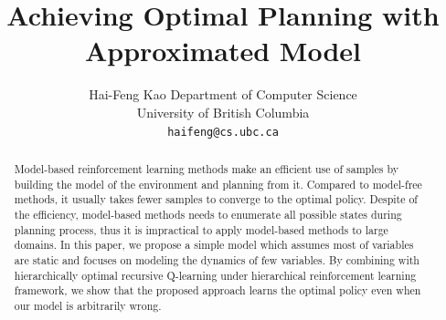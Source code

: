 \documentclass{article} %
\title{Achieving Optimal Planning with Approximated Model}
\author{
Hai-Feng Kao
Department of Computer Science\\
University of British Columbia\\
\texttt{haifeng@cs.ubc.ca}
}
\begin{document}
\maketitle

\begin{abstract}
Model-based reinforcement learning methods make an efficient use of samples by 
building the model of the environment and planning from it.
Compared to model-free methods, it usually takes fewer samples to converge to the optimal policy.
Despite of the efficiency, model-based methods
needs to enumerate all possible states during planning process,
thus it is impractical to apply model-based methods to large domains.
In this paper, we propose a simple model which assumes most of variables 
are static and focuses on modeling the dynamics of few variables.
By combining with 
hierarchically optimal recursive Q-learning under 
hierarchical reinforcement learning framework, we show that
the proposed approach learns the optimal policy even when
our model is arbitrarily wrong.
\end{abstract}
\end{document}
